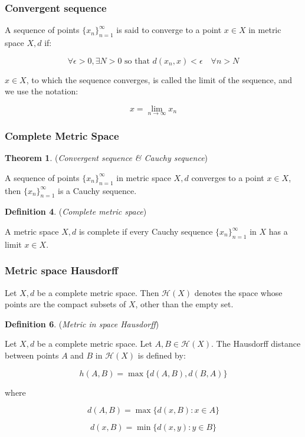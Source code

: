 \subsubsection{Convergent sequence}

A sequence of points \(\{x_n\}_{n=1}^\infty\) is said to converge to a point \(x \in X\) in metric space \(X, d\) if:

\[
\forall \epsilon > 0, \exists N > 0 \text{ so that } d(x_n, x) < \epsilon \quad \forall n > N
\]

\(x \in X\), to which the sequence converges, is called the limit of the sequence, and we use the notation:

\[
x = \lim_{n \to \infty} x_n
\]

\pagebreak
\subsubsection{Complete Metric Space}

\textbf{Theorem 1}. (\textit{Convergent sequence \& Cauchy sequence})

A sequence of points \(\{x_n\}_{n=1}^\infty\) in metric space \(X, d\) converges to a point \(x \in X\), then \(\{x_n\}_{n=1}^\infty\) is a Cauchy sequence.

\textbf{Definition 4}. (\textit{Complete metric space})

A metric space \(X, d\) is complete if every Cauchy sequence \(\{x_n\}_{n=1}^\infty\) in \(X\) has a limit \(x \in X\).

\subsubsection{Metric space Hausdorff}

Let \(X, d\) be a complete metric space. Then \(\mathcal{H}(X)\) denotes the space whose points are the compact subsets of \(X\), other than the empty set.

\textbf{Definition 6}. (\textit{Metric in space Hausdorff})

Let \(X, d\) be a complete metric space. Let \(A, B \in \mathcal{H}(X)\). The Hausdorff distance between points \(A\) and \(B\) in \(\mathcal{H}(X)\) is defined by:

\[
h(A, B) = \max\{d(A, B), d(B, A)\}
\]

where

\[
d(A, B) = \max\{d(x, B) : x \in A\}
\]

\[
d(x, B) = \min\{d(x, y) : y \in B\}
\]

